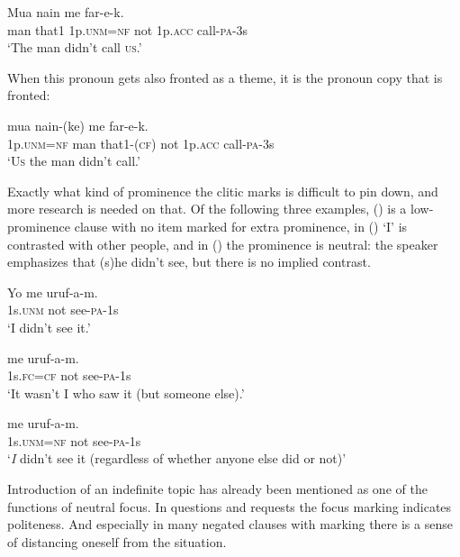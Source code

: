 \ea%
\label{ex:x1743}
\gll Mua  nain    me    far-e-k. \\
man  that1  1p.\textsc{unm}=\textsc{nf}  not  1p.\textsc{acc}  call-\textsc{pa}-3s      \\
\glt`The man didn't call \textsc{us}.'
\z


When this pronoun gets also fronted as a theme, it is the pronoun copy that is fronted:

\ea%
\label{ex:x1744}
\gll {}  mua  nain-(ke)  me    far-e-k. \\
1p.\textsc{unm}=\textsc{nf}  man  that1-(\textsc{cf})  not  1p.\textsc{acc}  call-\textsc{pa}-3s      \\
\glt`\textsc{\textsc{Us}}  the man didn't call.'
\z


Exactly what kind of prominence the  clitic marks is difficult to pin down, and more research is needed on that. Of the following three examples, () is a low-prominence clause with no item marked for extra prominence, in () `I' is contrasted with other people, and in () the prominence is neutral: the speaker emphasizes that (s)he didn't see, but there is no implied contrast. 

\ea%
\label{ex:x1734}
\gll Yo  me  uruf-a-m. \\
1s.\textsc{unm}  not  see-\textsc{pa}-1s      \\
\glt`I didn't see it.'
\z


\ea%
\label{ex:x1735}
\gll {}  me  uruf-a-m. \\
1s.\textsc{fc}=\textsc{cf}  not  see-\textsc{pa}-1s      \\
\glt`It wasn't I who saw it (but someone else).'
\z


\ea%
\label{ex:x1736}
\gll {}  me  uruf-a-m. \\
1s.\textsc{unm}=\textsc{nf}  not  see-\textsc{pa}-1s      \\
\glt`\textit{I}  didn't see it (regardless of whether anyone else did or not)'
\z


Introduction of an indefinite topic has already been mentioned as one of the functions of neutral focus. In questions and requests the focus marking indicates politeness. And especially in many negated clauses with  marking there is a sense of distancing oneself from the situation. 

